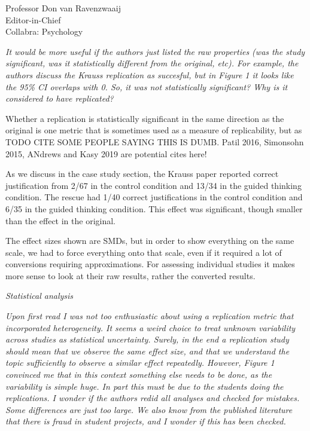 \documentclass{stanfordletter}
\newcommand{\theysaid}[1]{\begin{leftbar} \noindent 
		\textsl{ #1}\end{leftbar}}
\begin{document}
\begin{letter}{Professor Don van Ravenzwaaij \\ Editor-in-Chief \\ Collabra: Psychology }
		
		\theysaid{
		It would be more useful if the authors just listed the raw properties (was the study significant, was it statistically different from the original, etc). For example, the authors discuss the Krauss replication as succesful, but in Figure 1 it looks like the 95\% CI overlaps with 0. So, it was not statistically significant? Why is it considered to have replicated?}
		
		Whether a replication is statistically significant in the same direction as the original is one metric that is sometimes used as a measure of replicability, but as TODO CITE SOME PEOPLE SAYING THIS IS DUMB. Patil 2016, Simonsohn 2015, ANdrews and Kasy 2019 are potential cites here!
		
		As we discuss in the case study section, the Krauss paper reported correct justification from 2/67 in the control condition and 13/34 in the guided thinking condition.  The rescue had 1/40  correct justifications in the control condition and 6/35 in the guided thinking condition. This effect was significant, though smaller than the effect in the original. 
		
		The effect sizes shown are SMDs, but in order to show everything on the same scale, we had to force everything onto that scale, even if it required a lot of conversions requiring approximations. For assessing individual studies it makes more sense to look at their raw results, rather the converted results. 
		
		\theysaid{Statistical analysis}
		\theysaid{Upon first read I was not too enthusiastic about using a replication metric that incorporated heterogeneity. It seems a weird choice to treat unknown variability across studies as statistical uncertainty. Surely, in the end a replication study should mean that we observe the same effect size, and that we understand the topic sufficiently to observe a similar effect repeatedly. However, Figure 1 convinced me that in this context something else needs to be done, as the variability is simple huge. In part this must be due to the students doing the replications. I wonder if the authors redid all analyses and checked for mistakes. Some differences are just too large. We also know from the published literature that there is fraud in student projects, and I wonder if this has been checked.}
		

\end{letter}
\end{document}
